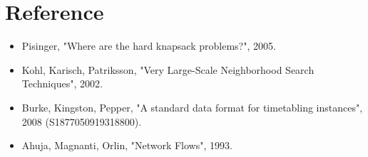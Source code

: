 \chapter{Reference}

\begin{itemize}
  \item Pisinger, "Where are the hard knapsack problems?", 2005.
  \item Kohl, Karisch, Patriksson, "Very Large-Scale Neighborhood
        Search Techniques", 2002.
  \item Burke, Kingston, Pepper, "A standard data format for timetabling
        instances", 2008 (S1877050919318800).
  \item Ahuja, Magnanti, Orlin, "Network Flows", 1993.
\end{itemize}

